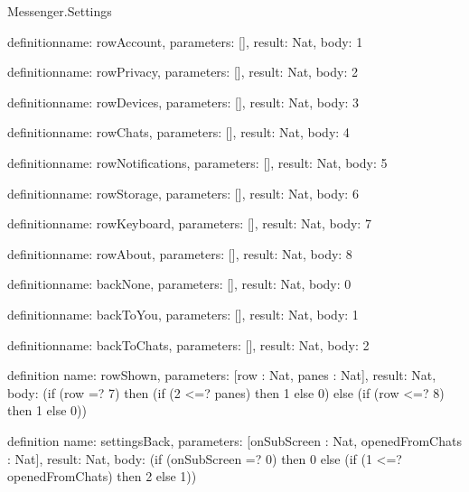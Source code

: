 \begin{lexlean}{Messenger.Settings}
\begin{semanticmodule}
definition{name: rowAccount, parameters: [], result: Nat, body: 1}

definition{name: rowPrivacy, parameters: [], result: Nat, body: 2}

definition{name: rowDevices, parameters: [], result: Nat, body: 3}

definition{name: rowChats, parameters: [], result: Nat, body: 4}

definition{name: rowNotifications, parameters: [], result: Nat, body: 5}

definition{name: rowStorage, parameters: [], result: Nat, body: 6}

definition{name: rowKeyboard, parameters: [], result: Nat, body: 7}

definition{name: rowAbout, parameters: [], result: Nat, body: 8}

definition{name: backNone, parameters: [], result: Nat, body: 0}

definition{name: backToYou, parameters: [], result: Nat, body: 1}

definition{name: backToChats, parameters: [], result: Nat, body: 2}

definition{
  name: rowShown,
  parameters: [row : Nat, panes : Nat],
  result: Nat,
  body: (if (row =? 7) then (if (2 <=? panes) then 1 else 0) else (if (row <=? 8) then 1 else 0))
}

definition{
  name: settingsBack,
  parameters: [onSubScreen : Nat, openedFromChats : Nat],
  result: Nat,
  body: (if (onSubScreen =? 0) then 0 else (if (1 <=? openedFromChats) then 2 else 1))
}
\end{semanticmodule}
\end{lexlean}
